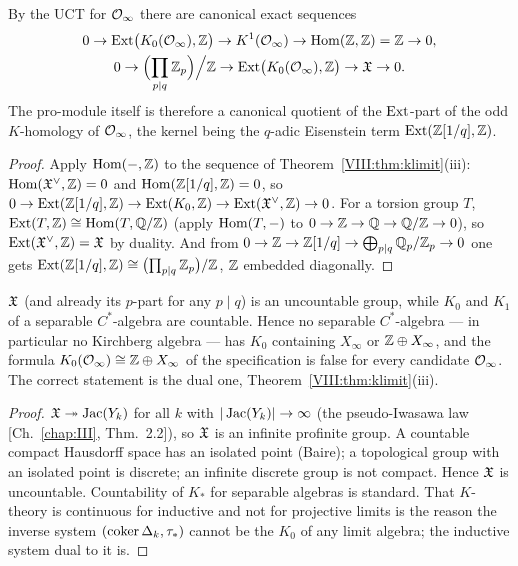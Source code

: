 \begin{corollary}\label{VIII:cor:khom}
By the UCT \cite{RS} for $\mathcal{O}_\infty$ there are canonical exact sequences
\begin{gather*}
0\to\operatorname{Ext}\bigl(K_0(\mathcal{O}_\infty),\mathbb{Z}\bigr)\to K^1(\mathcal{O}_\infty)\to\operatorname{Hom}(\mathbb{Z},\mathbb{Z})=\mathbb{Z}\to0,\\
0\to\Bigl(\prod_{p\mid q}\mathbb{Z}_p\Bigr)\Big/\mathbb{Z}\to\operatorname{Ext}\bigl(K_0(\mathcal{O}_\infty),\mathbb{Z}\bigr)\to\mathfrak{X}\to0 .
\end{gather*}
The pro-module itself is therefore a canonical quotient of the $\operatorname{Ext}$-part of the odd
$K$-homology of $\mathcal{O}_\infty$, the kernel being the $q$-adic Eisenstein term
$\operatorname{Ext}(\mathbb{Z}[1/q],\mathbb{Z})$.
\end{corollary}

\begin{proof}
Apply $\operatorname{Hom}(-,\mathbb{Z})$ to the sequence of Theorem~\ref{VIII:thm:klimit}(iii): $\operatorname{Hom}(\mathfrak{X}^{\vee},\mathbb{Z})=0$
and $\operatorname{Hom}(\mathbb{Z}[1/q],\mathbb{Z})=0$, so $0\to\operatorname{Ext}(\mathbb{Z}[1/q],\mathbb{Z})\to\operatorname{Ext}(K_0,\mathbb{Z})\to\operatorname{Ext}(\mathfrak{X}^{\vee},\mathbb{Z})\to0$.
For a torsion group $T$, $\operatorname{Ext}(T,\mathbb{Z})\cong\operatorname{Hom}(T,\mathbb{Q}/\mathbb{Z})$ (apply $\operatorname{Hom}(T,-)$ to
$0\to\mathbb{Z}\to\mathbb{Q}\to\mathbb{Q}/\mathbb{Z}\to0$), so $\operatorname{Ext}(\mathfrak{X}^{\vee},\mathbb{Z})=\mathfrak{X}$ by duality. And from
$0\to\mathbb{Z}\to\mathbb{Z}[1/q]\to\bigoplus_{p\mid q}\mathbb{Q}_p/\mathbb{Z}_p\to0$ one gets
$\operatorname{Ext}(\mathbb{Z}[1/q],\mathbb{Z})\cong\bigl(\prod_{p\mid q}\mathbb{Z}_p\bigr)/\mathbb{Z}$, $\mathbb{Z}$ embedded diagonally.
\end{proof}

\begin{theorem}\label{VIII:thm:nogo}
$\mathfrak{X}$ (and already its $p$-part for any $p\mid q$) is an uncountable group, while $K_0$
and $K_1$ of a separable $C^*$-algebra are countable. Hence no separable $C^*$-algebra
--- in particular no Kirchberg algebra --- has $K_0$ containing $X_\infty$ or
$\mathbb{Z}\oplus X_\infty$, and the formula $K_0(\mathcal{O}_\infty)\cong\mathbb{Z}\oplus X_\infty$ of the
specification is false for every candidate $\mathcal{O}_\infty$. The correct statement is the
dual one, Theorem~\ref{VIII:thm:klimit}(iii).
\end{theorem}

\begin{proof}
$\mathfrak{X}\twoheadrightarrow\operatorname{Jac}(Y_k)$ for all $k$ with $|\operatorname{Jac}(Y_k)|\to\infty$ (the
pseudo-Iwasawa law [Ch.~\ref{chap:III}, Thm.~2.2]), so $\mathfrak{X}$ is an infinite profinite group. A
countable compact Hausdorff space has an isolated point (Baire); a topological group
with an isolated point is discrete; an infinite discrete group is not compact. Hence
$\mathfrak{X}$ is uncountable. Countability of $K_*$ for separable algebras is standard. That
$K$-theory is continuous for inductive and not for projective limits is the reason the
inverse system $(\operatorname{coker}\Delta_k,\tau_*)$ cannot be the $K_0$ of any limit algebra; the
inductive system dual to it is.
\end{proof}

